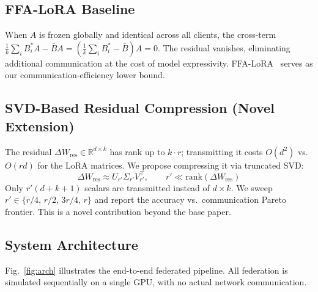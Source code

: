 \documentclass[conference]{IEEEtran}
\begin{document}
\subsection{FFA-LoRA Baseline}
When $A$ is frozen globally and identical across all clients, the cross-term
$\frac{1}{k}\sum_i B_i^* A - \bar{B}A = (\frac{1}{k}\sum_i B_i^* - \bar{B})A = 0$.
The residual vanishes, eliminating additional communication at the cost of
model expressivity. FFA-LoRA~\cite{b_ffalora} serves as our
communication-efficiency lower bound.

\subsection{SVD-Based Residual Compression (Novel Extension)}

The residual $\Delta W_{\mathrm{res}}\in\mathbb{R}^{d\times k}$ has rank up to
$k\cdot r$; transmitting it costs $O(d^2)$ vs.\ $O(rd)$ for the LoRA matrices.
We propose compressing it via truncated SVD:
\begin{equation}
  \Delta W_{\mathrm{res}} \approx U_{r'}\Sigma_{r'}V_{r'}^\top,
  \qquad r' \ll \mathrm{rank}(\Delta W_{\mathrm{res}})
  \label{eq:svd}
\end{equation}
Only $r'(d+k+1)$ scalars are transmitted instead of $d\times k$. We sweep
$r'\in\{r/4,\,r/2,\,3r/4,\,r\}$ and report the accuracy vs.\ communication
Pareto frontier. This is a novel contribution beyond the base paper.

\subsection{System Architecture}

Fig.~\ref{fig:arch} illustrates the end-to-end federated pipeline. All
federation is simulated sequentially on a single GPU, with no actual
network communication.
\end{document}
